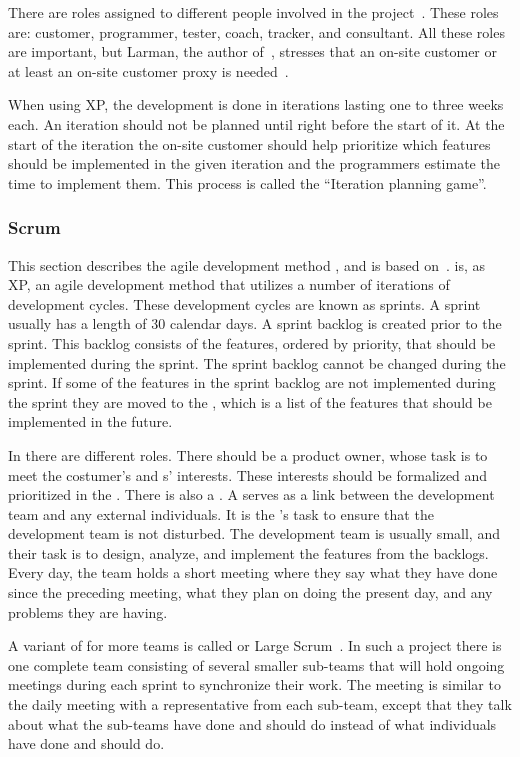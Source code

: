 There are roles assigned to different people involved in the project~\cite[p.~145]{Larman04}.
These roles are: customer, programmer, tester, coach, tracker, and consultant.
All these roles are important, but Larman, the author of~\cite{Larman04}, stresses that an on-site customer or at least an on-site customer proxy is needed~\cite[p.~152-156]{Larman04}.

When using XP, the development is done in iterations lasting one to three weeks each.
An iteration should not be planned until right before the start of it.
At the start of the iteration the on-site customer should help prioritize which features should be implemented in the given iteration and the programmers estimate the time to implement them.
This process is called the ``Iteration planning game''.

\subsubsection{Scrum}
\label{par:scrum}
This section describes the agile development method \scrum{}, and is based on~\cite[chap.~7,pp.~109-136]{Larman04}.
\Scrum{} is, as XP, an agile development method that utilizes a number of iterations of development cycles.
These development cycles are known as sprints.
A sprint usually has a length of 30 calendar days.
A sprint backlog is created prior to the sprint. 
This backlog consists of the features, ordered by priority, that should be implemented during the sprint.
The sprint backlog cannot be changed during the sprint.
If some of the features in the sprint backlog are not implemented during the sprint they are moved to the \productbacklog{}, which is a list of the features that should be implemented in the future.

In \scrum{} there are different roles.
There should be a product owner, whose task is to meet the costumer's and \euser{}s' interests. 
These interests should be formalized and prioritized in the \productbacklog{}.
There is also a \scrummaster{}. 
A \scrummaster{} serves as a link between the development team and any external individuals.
It is the \scrummaster{}'s task to ensure that the development team is not disturbed.
The development team is usually small, and their task is to design, analyze, and implement the features from the backlogs.
Every day, the \scrum{} team holds a short meeting where they say what they have done since the preceding meeting, what they plan on doing the present day, and any problems they are having.

A variant of \scrum{} for more teams is called \sos{} or Large Scrum~\cite[pp.~23-30]{scrumchecklist}\cite[p.~111]{Larman04}.
In such a project there is one complete team consisting of several smaller sub-teams that will hold ongoing \sos{} meetings during each sprint to synchronize their work.
The \sos{} meeting is similar to the daily \scrum{} meeting with a representative from each sub-team, except that they talk about what the sub-teams have done and should do instead of what individuals have done and should do.

